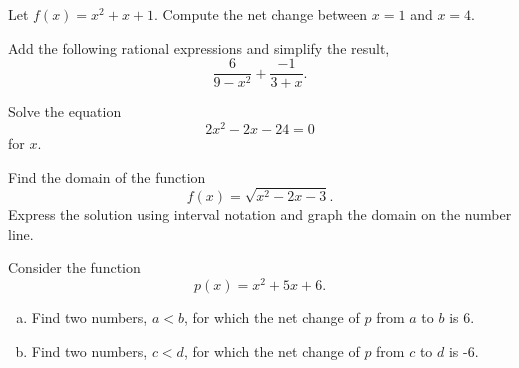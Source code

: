 \documentclass[12pt]{amsart}
\begin{document}
\begin{thm}[16 Points]\label{ex8}
  Let $f(x) = x^2 + x + 1$.  Compute the net change between $x = 1$ and $x = 4$.
\end{thm}

\newpage

\begin{thm}[16 Points]\label{ex9}
  Add the following rational expressions and simplify the result,
  $$\frac{6}{9 - x^2} + \frac{-1}{3 + x}.$$
\end{thm}

\newpage

\begin{thm}[16 Points]\label{ex10}
  Solve the equation
  $$2x^2 - 2x - 24 = 0$$
  for $x$.
  \vspace{3in}
\end{thm}

\begin{thm}[16 Points]\label{ex11}
  Find the domain of the function
  $$f(x) = \sqrt{x^2 - 2x - 3}.$$
  Express the solution using interval notation and graph the domain on the number line.
\end{thm}

\newpage

\begin{thm}\label{bonus}
  Consider the function
  $$p(x) = x^2 + 5x + 6.$$
  \begin{enumerate}[(a)]
  \item
    Find two numbers, $a < b$, for which the net change of $p$ from $a$ to $b$ is 6.
    \vspace{4in}
  \item
    Find two numbers, $c < d$, for which the net change of $p$ from $c$ to $d$ is -6.
  \end{enumerate}
\end{thm}
\end{document}
